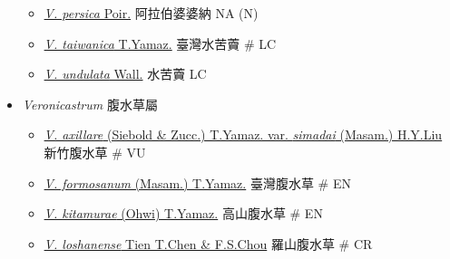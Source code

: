 \begin{itemize}
\begin{itemize}
        \item[] \href{http://www.theplantlist.org/tpl1.1/search?q=Veronica+persica}{\textit{V. persica} Poir.}   阿拉伯婆婆納   NA (N)
        \item[] \href{http://www.theplantlist.org/tpl1.1/search?q=Veronica+taiwanica}{\textit{V. taiwanica} T.Yamaz.}   臺灣水苦藚  \# LC
        \item[] \href{http://www.theplantlist.org/tpl1.1/search?q=Veronica+undulata}{\textit{V. undulata} Wall.}   水苦藚   LC
  \end{itemize}
 \item[] \textit{Veronicastrum} 腹水草屬
                                
  \begin{itemize}
        \item[] \href{http://www.theplantlist.org/tpl1.1/search?q=Veronicastrum+axillare+var.+simadai}{\textit{V. axillare} (Siebold \& Zucc.) T.Yamaz. var. \textit{simadai} (Masam.) H.Y.Liu}   新竹腹水草  \# VU
        \item[] \href{http://www.theplantlist.org/tpl1.1/search?q=Veronicastrum+formosanum}{\textit{V. formosanum} (Masam.) T.Yamaz.}   臺灣腹水草  \# EN
        \item[] \href{http://www.theplantlist.org/tpl1.1/search?q=Veronicastrum+kitamurae}{\textit{V. kitamurae} (Ohwi) T.Yamaz.}   高山腹水草  \# EN
        \item[] \href{http://www.theplantlist.org/tpl1.1/search?q=Veronicastrum+loshanense}{\textit{V. loshanense} Tien T.Chen \& F.S.Chou}   羅山腹水草  \# CR
  \end{itemize}
  \end{itemize}
